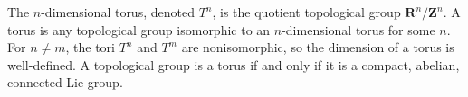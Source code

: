 The $n$-dimensional torus, denoted $T^n$, is the quotient topological group $\mathbf{R}^n / \mathbf{Z}^n$. A torus is any topological group isomorphic to an $n$-dimensional torus for some $n$. For $n \neq m$, the tori $T^n$ and $T^m$ are nonisomorphic, so the dimension of a torus is well-defined. A topological group is a torus if and only if it is a compact, abelian, connected Lie group.
